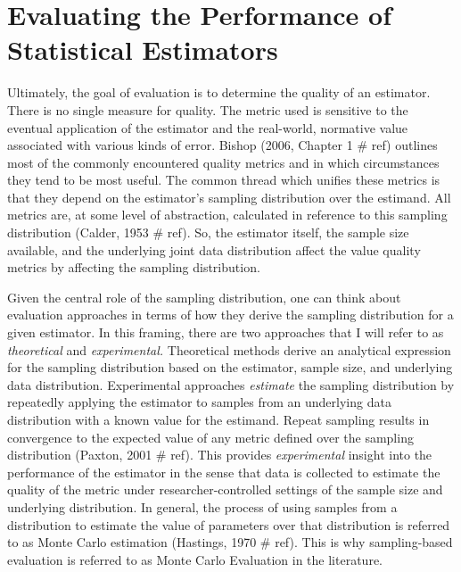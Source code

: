 \documentclass[../main.tex]{subfiles}
\begin{document}
\section{Evaluating the Performance of Statistical Estimators}

\vspace{\baselineskip}
Ultimately, the goal of evaluation is to determine the quality of an estimator. There is no single measure for quality. The metric used is sensitive to the eventual application of the estimator and the real-world, normative value associated with various kinds of error. Bishop (2006, Chapter 1 $\#$ ref) outlines most of the commonly encountered quality metrics and in which circumstances they tend to be most useful. The common thread which unifies these metrics is that they depend on the estimator's sampling distribution over the estimand. All metrics are, at some level of abstraction, calculated in reference to this sampling distribution (Calder, 1953 $\#$ ref). So, the estimator itself, the sample size available, and the underlying joint data distribution affect the value quality metrics by affecting the sampling distribution.\par


\vspace{\baselineskip}
Given the central role of the sampling distribution, one can think about evaluation approaches in terms of how they derive the sampling distribution for a given estimator. In this framing, there are two approaches that I will refer to as \textit{theoretical} and \textit{experimental.} Theoretical methods derive an analytical expression for the sampling distribution based on the estimator, sample size, and underlying data distribution. Experimental approaches \textit{estimate }the sampling distribution by repeatedly applying the estimator to samples from an underlying data distribution with a known value for the estimand. Repeat sampling results in convergence to the expected value of any metric defined over the sampling distribution (Paxton, 2001 $\#$ ref). This provides \textit{experimental} insight into the performance of the estimator in the sense that data is collected to estimate the quality of the metric under researcher-controlled settings of the sample size and underlying distribution. In general, the process of using samples from a distribution to estimate the value of parameters over that distribution is referred to as Monte Carlo estimation (Hastings, 1970 $\#$ ref). This is why sampling-based evaluation is referred to as Monte Carlo Evaluation in the literature.\par
\end{document}
